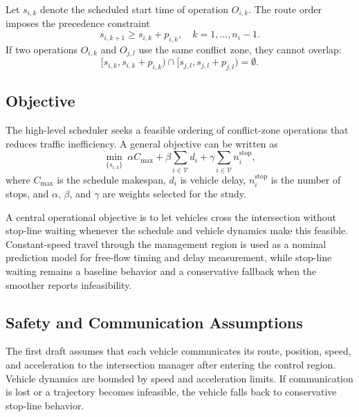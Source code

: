 Let $s_{i,k}$ denote the scheduled start time of operation $O_{i,k}$. The route order imposes the precedence constraint
\begin{equation}
  s_{i,k+1} \geq s_{i,k} + p_{i,k}, \quad k = 1,\ldots,n_i-1.
  \label{eq:precedence}
\end{equation}
If two operations $O_{i,k}$ and $O_{j,l}$ use the same conflict zone, they cannot overlap:
\begin{equation}
  [s_{i,k}, s_{i,k}+p_{i,k}) \cap [s_{j,l}, s_{j,l}+p_{j,l}) = \emptyset.
  \label{eq:disjunctive}
\end{equation}

\subsection{Objective}
The high-level scheduler seeks a feasible ordering of conflict-zone operations that reduces traffic inefficiency. A general objective can be written as
\begin{equation}
  \min_{\{s_{i,k}\}} \ \alpha C_{\max} + \beta \sum_{i \in \mathcal{V}} d_i + \gamma \sum_{i \in \mathcal{V}} n_i^{\mathrm{stop}},
  \label{eq:objective}
\end{equation}
where $C_{\max}$ is the schedule makespan, $d_i$ is vehicle delay, $n_i^{\mathrm{stop}}$ is the number of stops, and $\alpha$, $\beta$, and $\gamma$ are weights selected for the study.

\begin{addedtwoblock}
A central operational objective is to let vehicles cross the intersection without stop-line waiting whenever the schedule and vehicle dynamics make this feasible. Constant-speed travel through the management region is used as a nominal prediction model for free-flow timing and delay measurement, while stop-line waiting remains a baseline behavior and a conservative fallback when the smoother reports infeasibility.
\end{addedtwoblock}

\subsection{Safety and Communication Assumptions}
The first draft assumes that each vehicle communicates its route, position, speed, and acceleration to the intersection manager after entering the control region. Vehicle dynamics are bounded by speed and acceleration limits. If communication is lost or a trajectory becomes infeasible, the vehicle falls back to conservative stop-line behavior.

